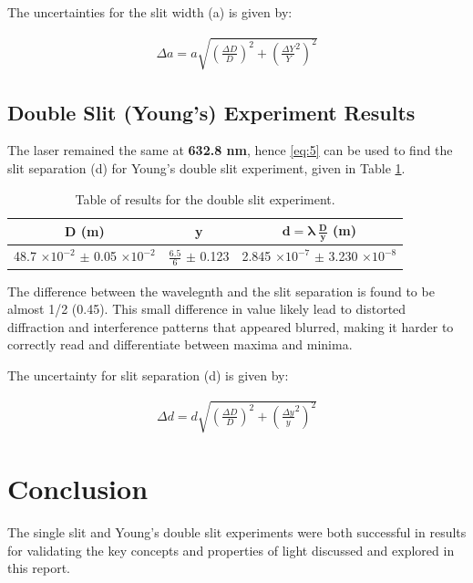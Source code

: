 \documentclass[12pt]{article}
\begin{document}
The uncertainties for the slit width (a) is given by:

\vspace{-2ex}
\begin{gather*}
    \Delta a = a \sqrt{\left( \frac{\Delta D}{D} \right)^2 + \left( \frac{\Delta Y}{Y}^2 \right)^2}
\end{gather*}

\subsection{Double Slit (Young's) Experiment Results}

The laser remained the same at \textbf{632.8 nm}, hence \ref{eq:5} can be used to find the slit separation (d) for Young's double slit experiment, given in Table \ref{tab:3}.

\begin{table}[H]
    \centering
    \caption{Table of results for the double slit experiment.}
    \label{tab:3}
    \begin{tabular}{ccc}
    \textbf{D (m)}                                    & \textbf{y}                 & \textbf{$\mathbf{d = \lambda \: \frac{D}{y}}$ (m)}      \\ \hline
    48.7 $\times 10^{-2}$ $\pm$ 0.05 $\times 10^{-2}$ & $\frac{6.5}{6}$ $\pm$ 0.123 & 2.845 $\times 10^{-7}$ $\pm$ 3.230 $\times 10^{-8}$
    \end{tabular}%
\end{table}

The difference between the wavelegnth and the slit separation is found to be almost 1/2 (0.45). This small difference in value likely lead to distorted diffraction and interference patterns that appeared blurred,
making it harder to correctly read and differentiate between maxima and minima. 

The uncertainty for slit separation (d) is given by:

\begin{gather*}
    \Delta d = d \sqrt{\left( \frac{\Delta D}{D} \right)^2 + \left( \frac{\Delta y}{y}^2 \right)^2}
\end{gather*}

\vspace{2cm}

\section{Conclusion} \label{sec:4}

The single slit and Young's double slit experiments were both successful in results for validating the key concepts and properties of light discussed and explored in this report.
\end{document}
